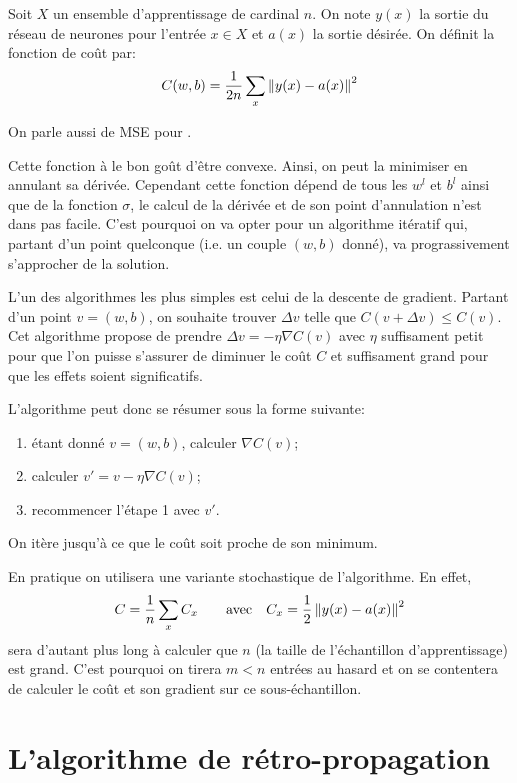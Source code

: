 \begin{definition}
Soit $X$ un ensemble d'apprentissage de cardinal $n$. 
On note $y(x)$ la sortie du réseau de neurones pour l'entrée $x \in X$ et 
$a(x)$ la sortie désirée. On définit la fonction de coût par:
\[
C(w, b) = \frac{1}{2n} \sum_{x} \left\Vert y(x) - a(x)\right\Vert^2
\]
\end{definition}

On parle aussi de \textsc{MSE} pour .

Cette fonction à le bon goût d'être convexe. Ainsi, on peut la minimiser en annulant 
sa dérivée. 
Cependant cette fonction dépend de tous les $w^{l}$ et $b^{l}$ ainsi que de la fonction 
$\sigma$, le calcul de la dérivée et de son point d'annulation n'est dans pas facile.
C'est pourquoi on va opter pour un algorithme itératif qui, partant d'un point quelconque 
(i.e.\/ un couple $(w,b)$ donné), va prograssivement s'approcher de la solution. 

L'un des algorithmes les plus simples est celui de la descente de gradient.
Partant d'un point $v = (w,b)$, on souhaite trouver $\Delta v$ telle que 
$C(v + \Delta v) \leq C(v)$. Cet algorithme propose de prendre 
$\Delta v = -\eta\nabla C(v)$ avec $\eta$ suffisament petit pour que 
l'on puisse s'assurer de diminuer le coût $C$ et suffisament grand pour que les 
effets soient significatifs.

L'algorithme peut donc se résumer sous la forme suivante:
\begin{enumerate}
  \item étant donné $v = (w, b)$, calculer $\nabla C(v)$;
  \item calculer $v' = v - \eta \nabla C(v)$;
  \item recommencer l'étape 1 avec $v'$.
\end{enumerate}
On itère jusqu'à ce que le coût soit proche de son minimum.

En pratique on utilisera une variante stochastique de l'algorithme. 
En effet, 
\[
C = \frac{1}{n} \sum_{x} C_x \qquad \text{avec} \quad C_x = \frac{1}{2} \left\Vert y(x) - a(x)\right\Vert^2
\]
sera d'autant plus long à calculer que $n$ (la taille de l'échantillon d'apprentissage) 
est grand.
C'est pourquoi on tirera $m < n$ entrées au hasard et on se contentera de calculer 
le coût et son gradient sur ce sous-échantillon.



\section{L'algorithme de rétro-propagation}


